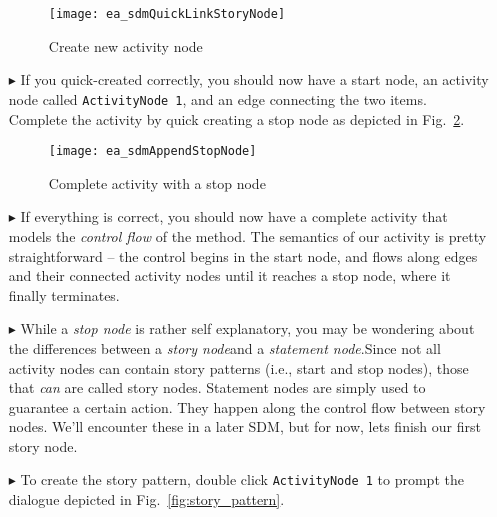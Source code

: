 \begin{itemize}
\begin{figure}[htp]
\begin{center}
  \texttt{[image: ea\_sdmQuickLinkStoryNode]}
  \caption{Create new activity node}  
  \label{fig:sdm_new_activity_node}
\end{center}
\end{figure}

\item[$\blacktriangleright$] If you quick-created correctly, you should now have a start node, an activity node called \texttt{ActivityNode 1}, and an edge
connecting the two items. Complete the activity by quick creating a stop node as depicted in Fig.~\ref{fig:sdm_stop_node}.

\begin{figure}[htp]
\begin{center}
  \texttt{[image: ea\_sdmAppendStopNode]}
  \caption{Complete activity with a stop node}  
  \label{fig:sdm_stop_node}
\end{center}
\end{figure}

\vspace{0.5cm}

\item[$\blacktriangleright$] If everything is correct, you should now have a complete activity that models the \emph{control flow} of the method. 
The semantics of our activity is pretty straightforward -- the control begins in the start node, and flows along edges and their connected activity nodes until
it reaches a stop node, where it finally terminates. 

\vspace{0.5cm}

\item[$\blacktriangleright$] While a \emph{stop node} is rather self explanatory, you may be wondering about the differences between a \emph{story
node}and a \emph{statement node}.Since not all activity nodes can contain story patterns (i.e., start and stop
nodes), those that \emph{can} are called story nodes. Statement nodes are simply used to guarantee a certain action. They happen along the control flow between
story nodes. We'll encounter these in a later SDM, but for now, lets finish our first story node.

\vspace{0.5cm}

\item[$\blacktriangleright$] To create the story pattern, double click \texttt{ActivityNode 1} to prompt the dialogue depicted in Fig.~\ref{fig:story_pattern}.


\end{itemize}
